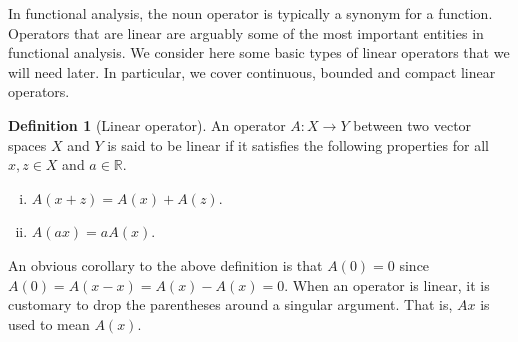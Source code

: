 \documentclass[english, 12pt, a4paper, sci, utf8, a-2b, online]{aaltothesis}
\theoremstyle{definition}
\newtheorem{definition}{Definition}[section]
\theoremstyle{plain}
\numberwithin{equation}{section}
\begin{document}
In functional analysis, the noun operator is typically a synonym for a function. 
Operators that are linear are arguably some of the most important entities
in functional analysis. We consider here some basic types of linear operators
that we will need later. In particular, we cover
continuous, bounded and compact linear operators.
\begin{definition}[Linear operator]
    \label{def:linearfunction}
    An operator $A: X \to Y$ between two vector spaces $X$ and $Y$
    is said to be linear if it satisfies the following properties
    for all $x,z \in X$ and $a \in \mathbb{R}$.
    \begin{enumerate}[(i)]
        \item $A(x+z) = A(x) + A(z)$.
        \item $A(ax) = a A(x)$.
    \end{enumerate}
\end{definition}
An obvious corollary to the above definition is that $A(0)=0$ since
$A(0)=A(x-x)=A(x)-A(x)=0$.
When an operator is linear, it is customary to
drop the parentheses around a singular argument.
That is, $Ax$ is used to mean $A(x)$.
\end{document}
